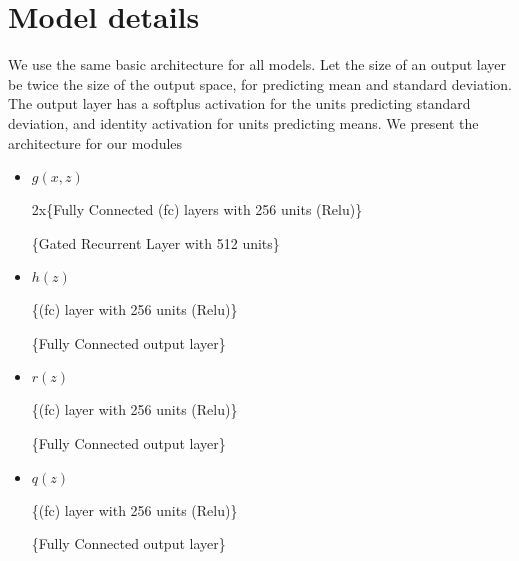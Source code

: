 \section{Model details}

We use the same basic architecture for all models. Let the size of an output layer be twice the size of the output space, for predicting mean and standard deviation. The output layer has a softplus activation for the units predicting standard deviation, and identity activation for units predicting means. We present the architecture for our modules

\begin{itemize}
    \item $g(x, z)$ 
        \begin{flushleft}2x\{Fully Connected (fc) layers with 256 units (Relu)\}\end{flushleft}
        \vspace{-15pt}
        \begin{flushleft}\{Gated Recurrent Layer with 512 units\}               \end{flushleft}
    
    \item $h(z)$ 
        \begin{flushleft}\{(fc) layer with 256 units (Relu)\}\end{flushleft}
        \vspace{-15pt}
        \begin{flushleft}\{Fully Connected output layer\}\end{flushleft}

    \item $r(z)$
        \begin{flushleft}\{(fc) layer with 256 units (Relu)\}\end{flushleft}
        \vspace{-15pt}
        \begin{flushleft}\{Fully Connected output layer\}\end{flushleft}
        
    \item $q(z)$ 
        \begin{flushleft}\{(fc) layer with 256 units (Relu)\}\end{flushleft}
        \vspace{-15pt}
        \begin{flushleft}\{Fully Connected output layer\}\end{flushleft}
\end{itemize}

